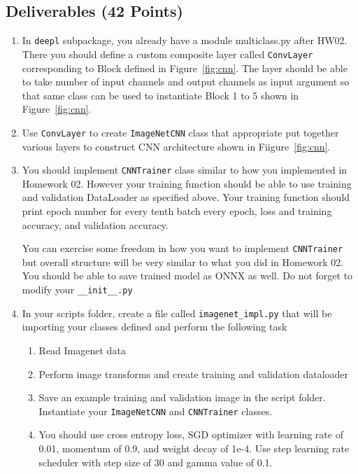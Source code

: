 \documentclass[12pt, xcolor=dvipsnames,svgnames,x11names]{article}
\begin{document}
\subsection{Deliverables \hfill \textbf{(42 Points)}}
\begin{enumerate}
\item In  \texttt{deepl} subpackage, you already have a module multiclass.py after HW02. There you should define a custom composite layer called \texttt{ConvLayer} corresponding to Block defined in Figure~\ref{fig:cnn}. The layer should be able to take number of input channels and output channels as input argument so that same class can be used to instantiate Block 1 to 5 shown in Figure~\ref{fig:cnn}.


\item Use \texttt{ConvLayer} to create \texttt{ImageNetCNN} class that appropriate put together various layers to construct CNN architecture shown in Fiigure~\ref{fig:cnn}. 

\item You should implement \texttt{CNNTrainer} class similar to how you implemented in Homework 02. However your training function should be able to use training and validation DataLoader as specified above.
Your training function should print epoch number for every tenth batch every epoch, loss and training accuracy, and validation accuracy.

You can exercise some freedom in how you want to implement \texttt{CNNTrainer} but overall structure will be very similar to what you did in Homework 02. You should be able to save trained model as ONNX as well. Do not forget to modify your \texttt{__init__.py}

\item In your scripts folder, create a file called \texttt{imagenet_impl.py} that will be importing your classes defined and perform the following task

\begin{enumerate}
\item Read Imagenet data
\item Perform image transforms and create training and validation dataloader
\item Save an example training and validation image in the script folder. Instantiate your \texttt{ImageNetCNN} and  \texttt{CNNTrainer} classes.
\item You should use cross entropy loss, SGD optimizer with learning rate of 0.01, momentum of 0.9, and weight decay of 1e-4. Use step learning rate scheduler with step size of 30 and gamma value of 0.1.


\end{enumerate}
\end{enumerate}
\end{document}
